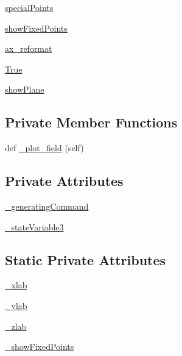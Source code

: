 \begin{DoxyCompactItemize}
\item 
\hyperlink{class_mu_mo_t_1_1_mu_mo_t_1_1_mu_mo_tvector_view_a3c1c635ffc7ed4d381b8c672ebfac0fb}{special\+Points}
\item 
\hyperlink{class_mu_mo_t_1_1_mu_mo_t_1_1_mu_mo_tvector_view_a22d867cfa21f7f37efee834159e18983}{show\+Fixed\+Points}
\item 
\hyperlink{class_mu_mo_t_1_1_mu_mo_t_1_1_mu_mo_tvector_view_a73c8f7f0d9593ed55a0cb1bea896b9f4}{ax\+\_\+reformat}
\item 
\hyperlink{class_mu_mo_t_1_1_mu_mo_t_1_1_mu_mo_tvector_view_a643a20c0c59588a0f741a6095e2025fd}{True}
\item 
\hyperlink{class_mu_mo_t_1_1_mu_mo_t_1_1_mu_mo_tvector_view_a44c38482b3d22d05f8bbadb81ec2d40a}{show\+Plane}
\end{DoxyCompactItemize}
\subsection*{Private Member Functions}
\begin{DoxyCompactItemize}
\item 
def \hyperlink{class_mu_mo_t_1_1_mu_mo_t_1_1_mu_mo_tvector_view_a50d59419298116f738a98c864afb9d89}{\+\_\+plot\+\_\+field} (self)
\end{DoxyCompactItemize}
\subsection*{Private Attributes}
\begin{DoxyCompactItemize}
\item 
\hyperlink{class_mu_mo_t_1_1_mu_mo_t_1_1_mu_mo_tvector_view_ace48ed03490093d8f44cde91e2f1e86e}{\+\_\+generating\+Command}
\item 
\hyperlink{class_mu_mo_t_1_1_mu_mo_t_1_1_mu_mo_tvector_view_ad2f8dc44173a16468bd9d3ab335f9b27}{\+\_\+state\+Variable3}
\end{DoxyCompactItemize}
\subsection*{Static Private Attributes}
\begin{DoxyCompactItemize}
\item 
\hyperlink{class_mu_mo_t_1_1_mu_mo_t_1_1_mu_mo_tvector_view_a865b2109ba10d874e84d4a354873b121}{\+\_\+xlab}
\item 
\hyperlink{class_mu_mo_t_1_1_mu_mo_t_1_1_mu_mo_tvector_view_aac1a25a634d53e524573f67eb5f3a7b9}{\+\_\+ylab}
\item 
\hyperlink{class_mu_mo_t_1_1_mu_mo_t_1_1_mu_mo_tvector_view_afcc07605f40039b605802f93b39ea910}{\+\_\+zlab}
\item 
\hyperlink{class_mu_mo_t_1_1_mu_mo_t_1_1_mu_mo_tvector_view_ac83a924ad62a2461d65b5c9bf9d27453}{\+\_\+show\+Fixed\+Points}
\end{DoxyCompactItemize}


